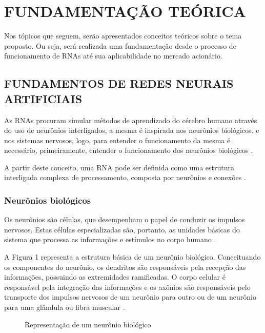 
\chapter{FUNDAMENTAÇÃO TEÓRICA}\label{ch:fundaments-teorico}
Nos tópicos que seguem, serão apresentados conceitos teóricos sobre o tema proposto. Ou seja, será realizada uma fundamentação desde o processo de funcionamento de RNAs até sua aplicabilidade no mercado acionário.

\section{FUNDAMENTOS DE REDES NEURAIS ARTIFICIAIS}\label{sec:fundamentos}
As RNAs procuram simular métodos de aprendizado do cérebro humano através do uso de neurônios interligados, a mesma é inspirada nos neurônios biológicos. e nos sistemas nervosos, logo, para entender o funcionamento da mesma é necessário, primeiramente, entender o funcionamento dos neurônios biológicos \cite{neto}.

A partir deste conceito, uma RNA pode ser definida como uma estrutura interligada complexa de processamento, composta por neurônios e conexões \cite{ferreira}.

\subsection{Neurônios biológicos} 
Os neurônios são células, que desempenham o papel de conduzir os impulsos nervosos. Estas células especializadas são, portanto, as unidades básicas do sistema que processa as informações e estímulos no corpo humano \cite{lent}. 

A Figura 1 representa a estrutura básica de um neurônio biológico. Conceituando os componentes do neurônio, os dendritos são responsáveis pela recepção das informações, possuindo as extremidades ramificadas. O corpo celular é responsável pela integração das informações e os axônios são responsáveis pelo transporte dos impulsos nervosos de um neurônio para outro ou de um neurônio para uma glândula ou fibra muscular \cite{lent}.

\begin{figure}[h]
	\centering
	\caption{Representação de um neurônio biológico}
	\label{exec-linearmente-separavel}
\end{figure} 

